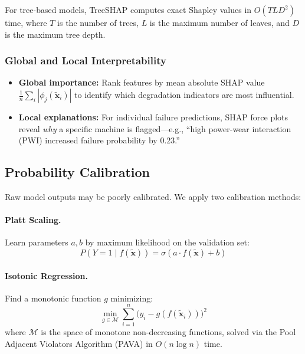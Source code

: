 \documentclass[12pt, a4paper]{article}
\begin{document}
For tree-based models, TreeSHAP computes exact Shapley values in $O(TLD^2)$ time, where $T$ is the number of trees, $L$ is the maximum number of leaves, and $D$ is the maximum tree depth.

\subsubsection{Global and Local Interpretability}

\begin{itemize}[leftmargin=*]
    \item \textbf{Global importance:} Rank features by mean absolute SHAP value $\frac{1}{n}\sum_i|\phi_j(\tilde{\mathbf{x}}_i)|$ to identify which degradation indicators are most influential.
    \item \textbf{Local explanations:} For individual failure predictions, SHAP force plots reveal \textit{why} a specific machine is flagged---e.g., ``high power-wear interaction (PWI) increased failure probability by 0.23.''
\end{itemize}

\subsection{Probability Calibration}

Raw model outputs may be poorly calibrated. We apply two calibration methods:

\paragraph{Platt Scaling.} Learn parameters $a, b$ by maximum likelihood on the validation set:
\begin{equation}
    P(Y=1 \mid f(\tilde{\mathbf{x}})) = \sigma(a\cdot f(\tilde{\mathbf{x}}) + b)
\end{equation}

\paragraph{Isotonic Regression.} Find a monotonic function $g$ minimizing:
\begin{equation}
    \min_{g \in \mathcal{M}} \sum_{i=1}^{n}\bigl(y_i - g(f(\tilde{\mathbf{x}}_i))\bigr)^2
\end{equation}
where $\mathcal{M}$ is the space of monotone non-decreasing functions, solved via the Pool Adjacent Violators Algorithm (PAVA) in $O(n\log n)$ time.
\end{document}
